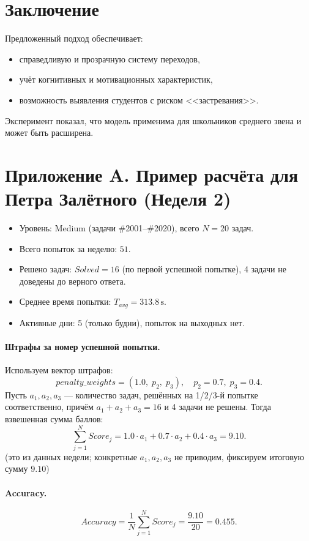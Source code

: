 \documentclass[12pt,a4paper]{article}
\begin{document}
\section{Заключение}
Предложенный подход обеспечивает:
\begin{itemize}
    \item справедливую и прозрачную систему переходов,
    \item учёт когнитивных и мотивационных характеристик,
    \item возможность выявления студентов с риском <<застревания>>.
\end{itemize}

Эксперимент показал, что модель применима для школьников среднего звена и может быть расширена.

\appendix
\section{Приложение A. Пример расчёта для Петра Залётного (Неделя 2)}

\begin{itemize}
  \item Уровень: Medium (задачи \#2001--\#2020), всего $N=20$ задач.
  \item Всего попыток за неделю: $51$.
  \item Решено задач: $Solved = 16$ (по первой успешной попытке), 4 задачи не доведены до верного ответа.
  \item Среднее время попытки: $T_{avg} = 313.8\,\text{s}$.
  \item Активные дни: 5 (только будни), попыток на выходных нет.
\end{itemize}

\paragraph{Штрафы за номер успешной попытки.}
Используем вектор штрафов:
\[
penalty\_weights=(1.0,\;p_2,\;p_3),\quad p_2=0.7,\;p_3=0.4.
\]
Пусть $a_1,a_2,a_3$ — количество задач, решённых на 1/2/3-й попытке соответственно, причём
$a_1+a_2+a_3=16$ и 4 задачи не решены. Тогда взвешенная сумма баллов:
\[
\textstyle \sum_{j=1}^{N} Score_j = 1.0\cdot a_1 + 0.7\cdot a_2 + 0.4\cdot a_3 = 9.10.
\]
(это из данных недели; конкретные $a_1,a_2,a_3$ не приводим, фиксируем итоговую сумму $9.10$)

\paragraph{Accuracy.}
\[
Accuracy=\frac{1}{N}\sum_{j=1}^{N}Score_j=\frac{9.10}{20}=0.455.
\]
\end{document}
